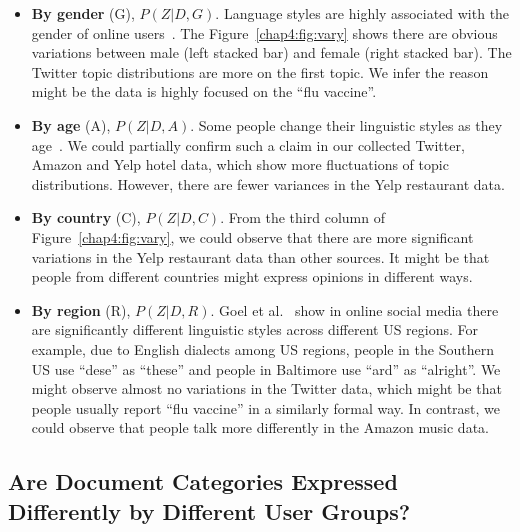 \begin{itemize}
    \item \textbf{By gender} (G), $P(Z|D, G)$. Language styles are highly associated with the gender of online users~\cite{hovy2018capturing}. The Figure~\ref{chap4:fig:vary} shows there are obvious variations between male (left stacked bar) and female (right stacked bar). The Twitter topic distributions are more on the first topic. We infer the reason might be the data is highly focused on the ``flu vaccine''.
    \item \textbf{By age} (A), $P(Z|D, A)$. Some people change their linguistic styles as they age~\cite{wagner2012age}. We could partially confirm such a claim in our collected Twitter, Amazon and Yelp hotel data, which show more fluctuations of topic distributions. However, there are fewer variances in the Yelp restaurant data. 
    \item \textbf{By country} (C), $P(Z|D, C)$. From the third column of Figure~\ref{chap4:fig:vary}, we could observe that there are more significant variations in the Yelp restaurant data than other sources. It might be that people from different countries might express opinions in different ways. 
    \item \textbf{By region} (R), $P(Z|D, R)$. Goel et al.~\cite{goel2016social} show in online social media there are significantly different linguistic styles across different US regions. For example, due to English dialects among US regions, people in the Southern US use ``dese'' as ``these'' and people in Baltimore use ``ard'' as ``alright''. We might observe almost no variations in the Twitter data, which might be that people usually report ``flu vaccine'' in a similarly formal way. In contrast, we could observe that people talk more differently in the Amazon music data. 
\end{itemize}


\subsection{Are Document Categories Expressed Differently by Different User Groups?}

